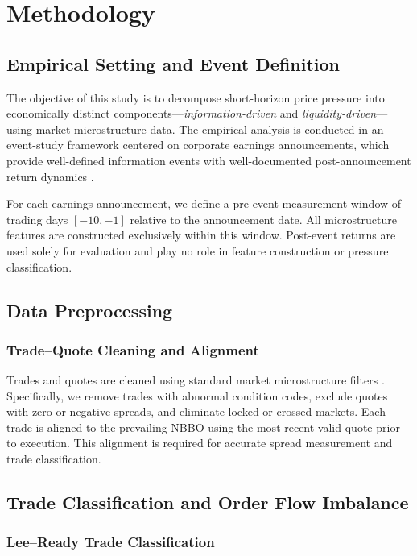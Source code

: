 \section{Methodology}

\subsection{Empirical Setting and Event Definition}

The objective of this study is to decompose short-horizon price pressure into
economically distinct components—\emph{information-driven} and
\emph{liquidity-driven}—using market microstructure data. The empirical analysis
is conducted in an event-study framework centered on corporate earnings
announcements, which provide well-defined information events with well-documented
post-announcement return dynamics \citep{BallBrown1968,BernardThomas1989}.

For each earnings announcement, we define a pre-event measurement window of
trading days $[-10,-1]$ relative to the announcement date. All microstructure
features are constructed exclusively within this window. Post-event returns are
used solely for evaluation and play no role in feature construction or pressure
classification.

\subsection{Data Preprocessing}

\subsubsection{Trade--Quote Cleaning and Alignment}

Trades and quotes are cleaned using standard market microstructure filters
\citep{Hasbrouck2007}. Specifically, we remove trades with abnormal condition
codes, exclude quotes with zero or negative spreads, and eliminate locked or
crossed markets. Each trade is aligned to the prevailing NBBO using the most
recent valid quote prior to execution. This alignment is required for accurate
spread measurement and trade classification.

\subsection{Trade Classification and Order Flow Imbalance}

\subsubsection{Lee--Ready Trade Classification}

